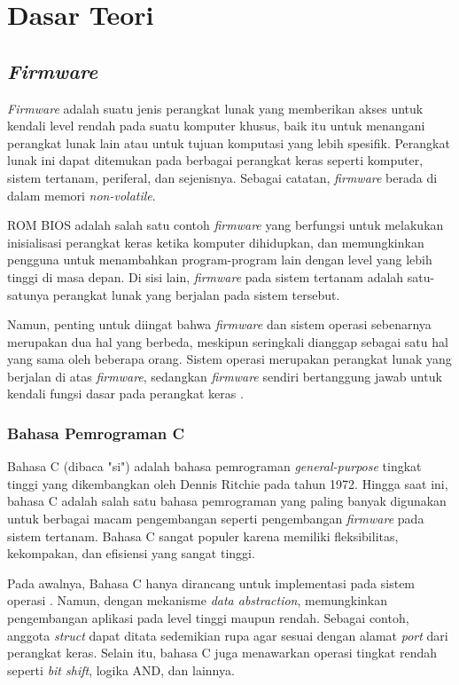 \section{Dasar Teori}
\subsection{\textit{Firmware}}
\textit{Firmware} adalah suatu jenis perangkat lunak yang memberikan akses untuk kendali level rendah pada suatu komputer khusus, baik itu untuk menangani perangkat lunak lain atau untuk tujuan komputasi yang lebih spesifik. Perangkat lunak ini dapat ditemukan pada berbagai perangkat keras seperti komputer, sistem tertanam, periferal, dan sejenisnya. Sebagai catatan, \textit{firmware} berada di dalam memori \textit{non-volatile}.

ROM BIOS adalah salah satu contoh \textit{firmware} yang berfungsi untuk melakukan inisialisasi perangkat keras ketika komputer dihidupkan, dan memungkinkan pengguna untuk menambahkan program-program lain dengan level yang lebih tinggi di masa depan. Di sisi lain, \textit{firmware} pada sistem tertanam adalah satu-satunya perangkat lunak yang berjalan pada sistem tersebut.

Namun, penting untuk diingat bahwa \textit{firmware} dan sistem operasi sebenarnya merupakan dua hal yang berbeda, meskipun seringkali dianggap sebagai satu hal yang sama oleh beberapa orang. Sistem operasi merupakan perangkat lunak yang berjalan di atas \textit{firmware}, sedangkan \textit{firmware} sendiri bertanggung jawab untuk kendali fungsi dasar pada perangkat keras \cite{Davidson1978}.

\subsubsection{Bahasa Pemrograman C}
Bahasa C (dibaca "si") adalah bahasa pemrograman \textit{general-purpose} tingkat tinggi yang dikembangkan oleh Dennis Ritchie pada tahun 1972. Hingga saat ini, bahasa C adalah salah satu bahasa pemrograman yang paling banyak digunakan \cite{SO2022} untuk berbagai macam pengembangan seperti pengembangan \textit{firmware} pada sistem tertanam. Bahasa C sangat populer karena memiliki fleksibilitas, kekompakan, dan efisiensi yang sangat tinggi.

Pada awalnya, Bahasa C hanya dirancang untuk implementasi pada sistem operasi \cite{Ritchie1993}. Namun, dengan mekanisme \textit{data abstraction}, memungkinkan pengembangan aplikasi pada level tinggi maupun rendah. Sebagai contoh, anggota \textit{struct} dapat ditata sedemikian rupa agar sesuai dengan alamat \textit{port} dari perangkat keras. Selain itu, bahasa C juga menawarkan operasi tingkat rendah seperti \textit{bit shift}, logika AND, dan lainnya.

